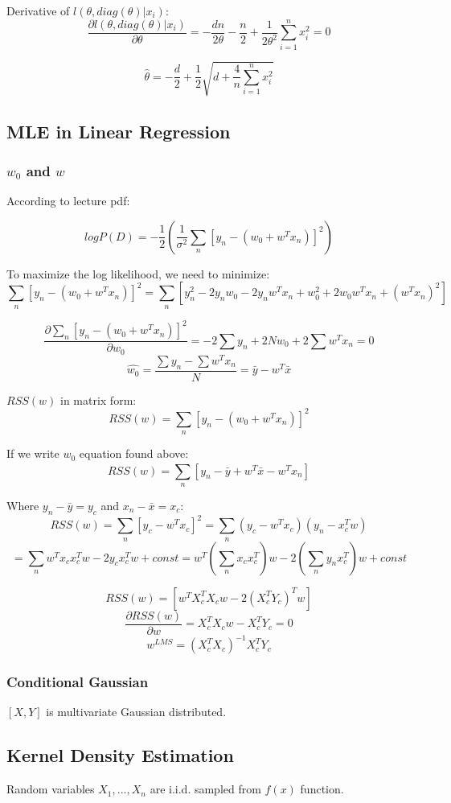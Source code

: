 \documentclass[letter,11pt]{article}
\begin{document}
	Derivative of $l(\theta,diag(\theta)|x_{i})$:
	$$\frac{\partial l(\theta,diag(\theta)|x_{i})}{\partial \theta} = -\frac{dn}{2\theta} - \frac{n}{2} + \frac{1}{2\theta^{2}}\sum_{i=1}^{n}x_{i}^{2} = 0$$
	
	$$\hat{\theta} = -\frac{d}{2} + \frac{1}{2}\sqrt{d+\frac{4}{n}\sum_{i=1}^{n}x_{i}^{2}}$$
	\subsection{MLE in Linear Regression}
	\subsubsection{$w_0$ and $w$}
	According to lecture pdf:
	
	$$logP(D) = -\frac{1}{2}(\frac{1}{\sigma^2}\sum_{n}^{}[y_n-(w_0+w^Tx_n)]^2)$$
	
	To maximize the log likelihood, we need to minimize:
	$$\sum_{n}^{}[y_n - (w_0+w^Tx_n)]^2 = \sum_{n}^{}[y_n^2-2y_nw_0-2y_nw^Tx_n+w_0^2+2w_0w^Tx_n+(w^Tx_n)^2]$$
	
$$\frac{\partial \sum_{n}^{}[y_n - (w_0+w^Tx_n)]^2}{\partial w_0} = -2\sum y_n + 2Nw_0+2\sum w^Tx_n = 0$$
	$$\hat{w_0} = \frac{\sum y_n - \sum w^Tx_n}{N} = \bar{y}-w^T\bar{x}$$
	
	$RSS(w)$ in matrix form:
	$$RSS(w) = \sum_{n}^{}[y_n-(w_0+w^Tx_n)]^2$$
	
	If we write $w_0$ equation found above:
	$$RSS(w) = \sum_{n}^{}[y_n-\bar{y}+w^T\bar{x}-w^Tx_n]$$
	
	Where $y_n - \bar{y} = y_c$ and $x_n - \bar{x} = x_c$:
	$$RSS(w) = \sum_{n}^{}[y_c-w^Tx_c]^2 = \sum_{n}^{}(y_c-w^Tx_c)(y_n-x_c^Tw)$$
	$$= \sum_{n}^{}w^Tx_cx_c^Tw-2y_cx_c^Tw+ const = {w^T(\sum_{n}^{}x_cx_c^T)w - 2(\sum_{n}^{}y_nx_c^T)w} + const$$
	
	$$RSS(w) = [w^TX_c^TX_cw-2(X_c^TY_c)^Tw]$$
	$$\frac{\partial RSS(w)}{\partial w} = X_c^TX_cw-X_c^TY_c = 0$$
	$$w^{LMS} =(X_c^TX_c)^{-1}X_c^TY_c$$
	
	\subsubsection{Conditional Gaussian}
	
	$[X,Y]$ is multivariate Gaussian distributed.
	
	
	
	\subsection{Kernel Density Estimation}
	Random variables $X_1,...,X_n$ are i.i.d. sampled from $f(x)$ function.
	
\end{document}
